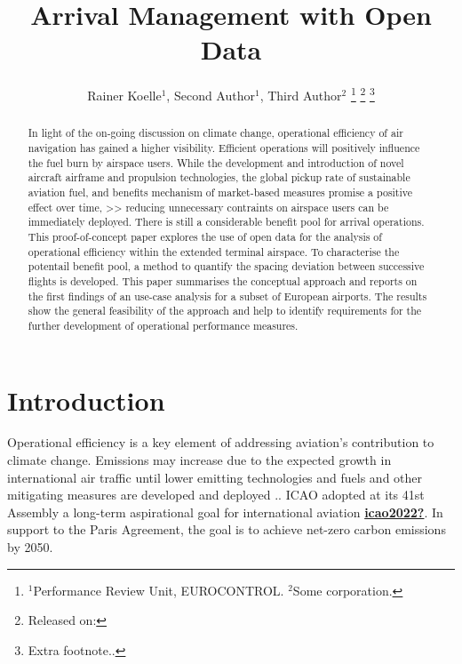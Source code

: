 \documentclass[letterpaper, 10 pt, journal, twoside]{IEEEtran}
\begin{document}
\author{
        Rainer Koelle\(^1\),     Second
Author\(^1\),     Third Author\(^2\)
    \thanks{\(^1\)Performance Review Unit, EUROCONTROL. \(^2\)Some
corporation.}
    \thanks{Released on: }
    \thanks{Extra footnote..}
}


\title{Arrival Management with Open Data}
\maketitle

\begin{abstract}
    In light of the on-going discussion on climate change, operational
    efficiency of air navigation has gained a higher visibility.
    Efficient operations will positively influence the fuel burn by
    airspace users. While the development and introduction of novel
    aircraft airframe and propulsion technologies, the global pickup
    rate of sustainable aviation fuel, and benefits mechanism of
    market-based measures promise a positive effect over time,
    \textgreater\textgreater{} reducing unnecessary contraints on
    airspace users can be immediately deployed. There is still a
    considerable benefit pool for arrival operations. This
    proof-of-concept paper explores the use of open data for the
    analysis of operational efficiency within the extended terminal
    airspace. To characterise the potentail benefit pool, a method to
    quantify the spacing deviation between successive flights is
    developed. This paper summarises the conceptual approach and reports
    on the first findings of an use-case analysis for a subset of
    European airports. The results show the general feasibility of the
    approach and help to identify requirements for the further
    development of operational performance measures.
\end{abstract}

\hypertarget{introduction}{%
\section{Introduction}\label{introduction}}

Operational efficiency is a key element of addressing aviation's
contribution to climate change. Emissions may increase due to the
expected growth in international air traffic until lower emitting
technologies and fuels and other mitigating measures are developed and
deployed .. ICAO adopted at its 41st Assembly a long-term aspirational
goal for international aviation
\protect\hyperlink{ref-icao2022}{\textbf{icao2022?}}. In support to the
Paris Agreement, the goal is to achieve net-zero carbon emissions by
2050.
\end{document}
